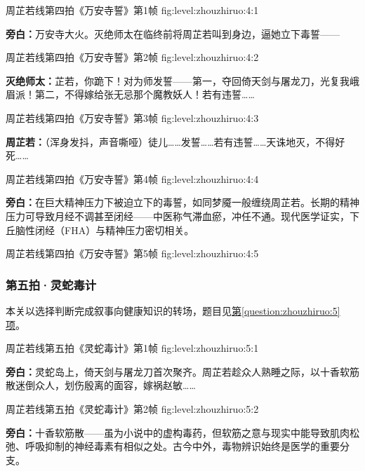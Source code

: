   {周芷若线第四拍《万安寺誓》第1帧}
  {fig:level:zhouzhiruo:4:1}
  {\scriptsize}
  {\textbf{旁白：}万安寺大火。灭绝师太在临终前将周芷若叫到身边，逼她立下毒誓——\par}

  {周芷若线第四拍《万安寺誓》第2帧}
  {fig:level:zhouzhiruo:4:2}
  {\scriptsize}
  {\textbf{灭绝师太：}芷若，你跪下！对为师发誓——第一，夺回倚天剑与屠龙刀，光复我峨眉派！第二，不得嫁给张无忌那个魔教妖人！若有违誓……\par}

  {周芷若线第四拍《万安寺誓》第3帧}
  {fig:level:zhouzhiruo:4:3}
  {\scriptsize}
  {\textbf{周芷若：}（浑身发抖，声音嘶哑）徒儿……发誓……若有违誓……天诛地灭，不得好死……\par}

\clearpage

  {周芷若线第四拍《万安寺誓》第4帧}
  {fig:level:zhouzhiruo:4:4}
  {\scriptsize}
  {\textbf{旁白：}在巨大精神压力下被迫立下的毒誓，如同梦魇一般缠绕周芷若。长期的精神压力可导致月经不调甚至闭经——中医称气滞血瘀，冲任不通。现代医学证实，下丘脑性闭经（FHA）与精神压力密切相关。\par}

  {周芷若线第四拍《万安寺誓》第5帧}
  {fig:level:zhouzhiruo:4:5}
  {\scriptsize}
  {\mbox{}}

\subsubsection{第五拍·灵蛇毒计}\label{plot:zhouzhiruo:5}
本关以选择判断完成叙事向健康知识的转场，题目见\hyperref[question:zhouzhiruo:5]{第\ref*{question:zhouzhiruo:5}项}。

  {周芷若线第五拍《灵蛇毒计》第1帧}
  {fig:level:zhouzhiruo:5:1}
  {\scriptsize}
  {\textbf{旁白：}灵蛇岛上，倚天剑与屠龙刀首次聚齐。周芷若趁众人熟睡之际，以十香软筋散迷倒众人，划伤殷离的面容，嫁祸赵敏……\par}

\clearpage

  {周芷若线第五拍《灵蛇毒计》第2帧}
  {fig:level:zhouzhiruo:5:2}
  {\scriptsize}
  {\textbf{旁白：}十香软筋散——虽为小说中的虚构毒药，但软筋之意与现实中能导致肌肉松弛、呼吸抑制的神经毒素有相似之处。古今中外，毒物辨识始终是医学的重要分支。\par}

